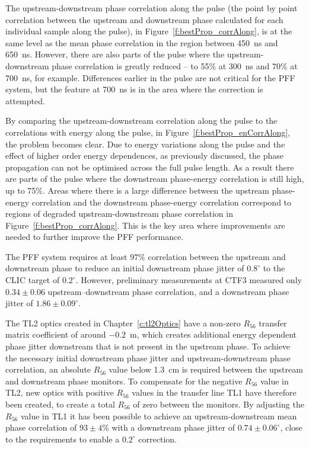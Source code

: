 The upstream-downstream phase correlation along the pulse (the point by point correlation between the upstream and downstream phase calculated for each individual sample along the pulse), in Figure~\ref{f:bestProp_corrAlong}, is at the same level as the mean phase correlation in the region between 450~ns and 650~ns. However, there are also parts of the pulse where the upstream-downstream phase correlation is greatly reduced -- to 55\% at 300~ns and 70\% at 700~ns, for example. Differences earlier in the pulse are not critical for the PFF system, but the feature at 700~ns is in the area where the correction is attempted.

By comparing the upstream-downstream correlation along the pulse to the correlations with energy along the pulse, in Figure~\ref{f:bestProp_enCorrAlong}, the problem becomes clear. Due to energy variations along the pulse and the effect of higher order energy dependences, as previously discussed, the phase propagation can not be optimised across the full pulse length. As a result there are parts of the pulse where the downstream phase-energy correlation is still high, up to 75\%. Areas where there is a large difference between the upstream phase-energy correlation and the downstream phase-energy correlation correspond to regions of degraded upstream-downstream phase correlation in Figure~\ref{f:bestProp_corrAlong}. This is the key area where improvements are needed to further improve the PFF performance.




The PFF system requires at least \(97\%\) correlation between the upstream and downstream phase to reduce an initial downstream phase jitter of \(0.8^\circ\) to the CLIC target of \(0.2^\circ\). However, preliminary measurements at CTF3 measured only \(0.34\pm0.06\) upstream--downstream phase correlation, and a downstream phase jitter of \(1.86\pm0.09^\circ\).

The TL2 optics created in Chapter~\ref{c:tl2Optics} have a non-zero \(R_{56}\) transfer matrix coefficient of around \(-0.2\)~m, which creates additional energy dependent phase jitter downstream that is not present in the upstream phase. To achieve the necessary initial downstream phase jitter and upstream-downstream phase correlation, an absolute \(R_{56}\) value below 1.3~cm is required between the upstream and downstream phase monitors. To compensate for the negative \(R_{56}\) value in TL2, new optics with positive \(R_{56}\) values in the transfer line TL1 have therefore been created, to create a total \(R_{56}\) of zero between the monitors. By adjusting the \(R_{56}\) value in TL1 it has been possible to achieve an upstream-downstream mean phase correlation of \(93\pm4\%\) with a downstream phase jitter of \(0.74\pm0.06^\circ\), close to the requirements to enable a \(0.2^\circ\) correction.

